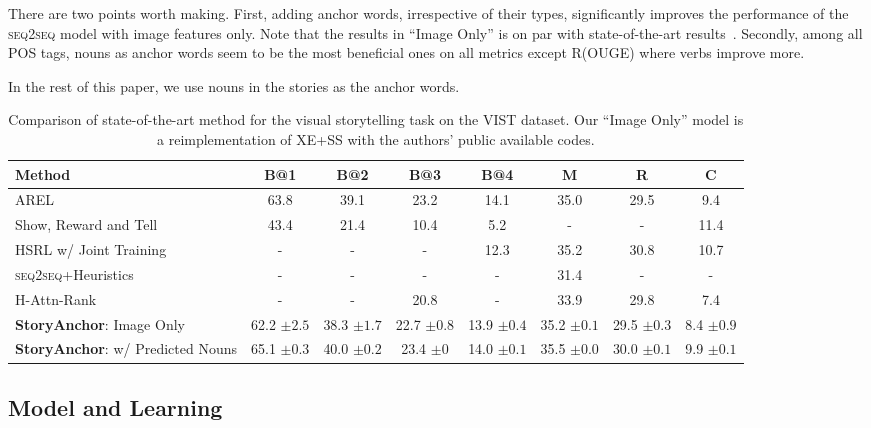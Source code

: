 There are two points worth making. First, adding anchor words, irrespective of their types, significantly improves the performance of the \textsc{seq2seq} model with image features only. Note that the results in ``Image Only'' is on par with state-of-the-art results~\cite{wang2018no}. Secondly, among all POS tags, nouns as anchor words seem to be the most beneficial ones on all metrics except R(OUGE) where verbs improve more.

In the rest of this paper, we use nouns in the stories as the anchor words.



\begin{table*}[th]
    \small
    \centering
        \begin{tabular}{l c c c c c c c}
            \toprule
            Method & B@1 & B@2 & B@3 & B@4 & M & R & C  \\
            \midrule
            AREL \cite{wang2018no} & 63.8 & 39.1 & 23.2 & 14.1 & 35.0 & 29.5 & 9.4\\
            Show, Reward and Tell \cite{wang2018show} & 43.4 & 21.4 & 10.4 & 5.2 & - & - & 11.4 \\
            HSRL w/ Joint Training \cite{huang2018hierarchically} & - & - & - & 12.3 & 35.2& 30.8 & 10.7 \\
            \textsc{seq2seq}+Heuristics~\cite{huang2016visual} & - & - & - & - & 31.4 & - & -\\
            H-Attn-Rank\cite{yu2017hierarchically} & - & - & 20.8 & - & 33.9 & 29.8 & 7.4 \\
            \textbf{StoryAnchor}: Image Only & 62.2 \tiny $\pm2.5$ & 38.3 \tiny $\pm1.7$ & 22.7 \tiny $\pm0.8$ & 13.9 \tiny $\pm 0.4$ & 35.2 \tiny $\pm 0.1$ & 29.5 \tiny $\pm 0.3$ & 8.4 \tiny $\pm 0.9$ \\
            \textbf{StoryAnchor}: w/ Predicted Nouns & 65.1 \tiny $\pm 0.3$ & 40.0 \tiny $\pm 0.2$ & 23.4 \tiny $\pm 0$ & 14.0 \tiny $\pm 0.1$ & 35.5 \tiny $\pm 0.0$ & 30.0 \tiny $\pm 0.1$ & 9.9 \tiny $\pm 0.1$ \\
            \bottomrule
        \end{tabular}
    \caption{Comparison of  state-of-the-art method for the visual storytelling task on the VIST dataset. Our ``Image Only'' model is a reimplementation of XE+SS \cite{wang2018no} with the authors' public available codes.}
    \label{tab:SOTA}
    \vspace {-15pt}
\end{table*}


\subsection{Model and Learning}
\label{hwpred}

